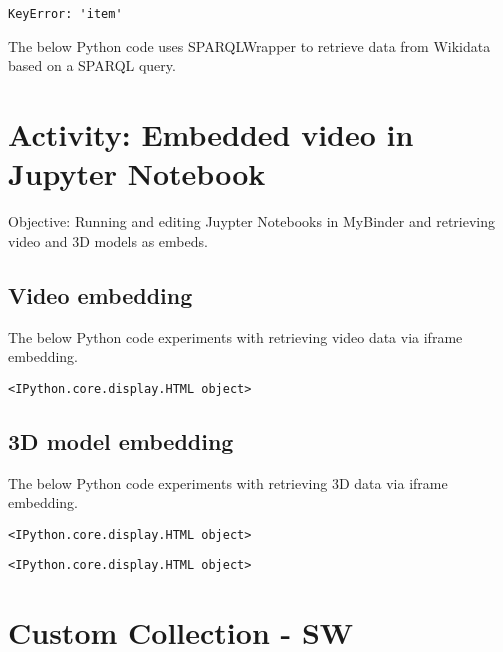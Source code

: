 \documentclass[
  letterpaper,
]{book}
\begin{document}
\begin{verbatim}
KeyError: 'item'
\end{verbatim}

The below Python code uses SPARQLWrapper to retrieve data from Wikidata
based on a SPARQL query.


\hypertarget{activity-embedded-video-in-jupyter-notebook}{%
\chapter{Activity: Embedded video in Jupyter
Notebook}\label{activity-embedded-video-in-jupyter-notebook}}

Objective: Running and editing Juypter Notebooks in MyBinder and
retrieving video and 3D models as embeds.

\hypertarget{video-embedding}{%
\section{Video embedding}\label{video-embedding}}

The below Python code experiments with retrieving video data via iframe
embedding.

\begin{verbatim}
<IPython.core.display.HTML object>
\end{verbatim}

\hypertarget{d-model-embedding}{%
\section{3D model embedding}\label{d-model-embedding}}

The below Python code experiments with retrieving 3D data via iframe
embedding.

\begin{verbatim}
<IPython.core.display.HTML object>
\end{verbatim}

\begin{verbatim}
<IPython.core.display.HTML object>
\end{verbatim}


\hypertarget{custom-collection---sw}{%
\chapter{Custom Collection - SW}\label{custom-collection---sw}}
\end{document}
